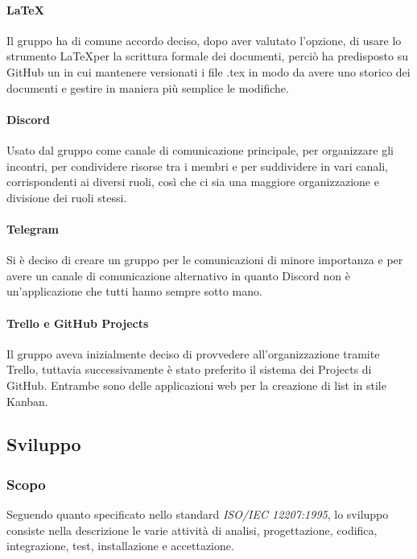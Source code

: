 \documentclass[../norme_di_progetto.tex]{subfiles}
\begin{document}
\paragraph{\LaTeX}
Il gruppo ha di comune accordo deciso, dopo aver valutato l'opzione, di usare lo strumento \LaTeX per la scrittura formale dei documenti, perciò ha predisposto su GitHub un  in cui mantenere versionati i file .tex in modo da avere uno storico dei documenti e gestire in maniera più semplice le modifiche.

\paragraph{Discord}
Usato dal gruppo come canale di comunicazione principale, per organizzare gli incontri, per condividere risorse tra i membri e per suddividere in vari canali, corrispondenti ai diversi ruoli, così che ci sia una maggiore organizzazione e divisione dei ruoli stessi.

\paragraph{Telegram}
Si è deciso di creare un gruppo  per le comunicazioni di minore importanza e per avere un canale di comunicazione alternativo in quanto Discord non è un'applicazione che tutti hanno sempre sotto mano.

\paragraph{Trello e GitHub Projects}
Il gruppo aveva inizialmente deciso di provvedere all'organizzazione tramite Trello, tuttavia successivamente è stato preferito il sistema dei Projects di GitHub. Entrambe sono delle applicazioni web per la creazione di list in stile Kanban.

\subsection{Sviluppo}

\subsubsection{Scopo}
Seguendo quanto specificato nello standard \emph{ISO/IEC  12207:1995}, lo sviluppo consiste nella descrizione le varie attività di analisi, progettazione, codifica, integrazione, test, installazione e accettazione.
\end{document}
